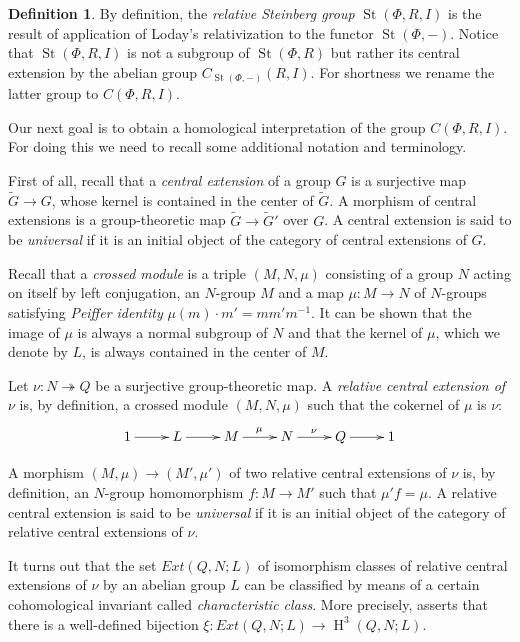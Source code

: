 \documentclass[oneside, 8pt]{amsart}
\theoremstyle{remark}
\theoremstyle{definition}
\numberwithin{lemma}{section}
\numberwithin{prop}{section}
\numberwithin{corollary}{section}
\newtheorem{df}[lemma]{Definition} \Crefname{df}{Definition}{Definitions}
\DeclareMathOperator{\St}{St}
\DeclareMathOperator{\HH}{H}
\numberwithin{equation}{section}
\begin{document}
\begin{df} By definition, the {\it relative Steinberg group} $\St(\Phi, R, I)$ is the result of application of Loday's relativization to the functor $\St(\Phi, -)$. Notice that $\St(\Phi, R, I)$ is not a subgroup of $\St(\Phi, R)$ but rather its central extension by the abelian group $C_{\St(\Phi, -)}(R, I)$. For shortness we rename the latter group to $C(\Phi, R, I)$. \end{df}

Our next goal is to obtain a homological interpretation of the group $C(\Phi, R, I)$.
For doing this we need to recall some additional notation and terminology.

First of all, recall that a {\it central extension} of a group $G$ is a surjective map $\widetilde{G} \to G$, whose kernel is contained in the center of $\widetilde{G}$. 
A morphism of central extensions is a group-theoretic map $\widetilde{G} \to \widetilde{G}'$ over $G$.
A central extension is said to be {\it universal} if it is an initial object of the category of central extensions of $G$.

Recall that a {\it crossed module} is a triple $(M, N, \mu)$ consisting of a group $N$ acting on itself by left conjugation, an $N$-group $M$ and a map
 $\mu \colon M\to N$ of $N$-groups satisfying {\it Peiffer identity} $\mu(m) \cdot m' = m m' m^{-1}$. It can be shown that the image of $\mu$ is always
  a normal subgroup of $N$ and that the kernel of $\mu$, which we denote by $L$, is always contained in the center of $M$. %
 
Let $\nu \colon N \twoheadrightarrow Q$ be a surjective group-theoretic map.
A {\it relative central extension of $\nu$} is, by definition,
a crossed module $(M, N, \mu)$ such that the cokernel of $\mu$ is $\nu$:
\begin{equation} \label{RelativeCentralExtension}
 \xymatrix{ 1 \ar[r] & L \ar[r] & M \ar^{\mu}[r] & N \ar^{\nu}[r] & Q \ar[r] & 1} \end{equation}

A morphism $(M, \mu) \to (M', \mu')$ of two relative central extensions of $\nu$ is, by definition, an $N$-group homomorphism $f\colon M \to M'$ such that $\mu' f = \mu$. 
A relative central extension is said to be {\it universal} if it is an initial object of the category of relative central extensions of $\nu$. 

It turns out that the set  $Ext(Q, N; L)$  of isomorphism classes of relative central extensions of $\nu$ by an abelian group $L$ can be classified by means of a certain cohomological invariant called {\it characteristic class}. More precisely, \cite[Th{\'e}or{\`e}me~1]{Lo78} asserts that there is a well-defined bijection $\xi \colon Ext(Q, N; L) \to \HH^3(Q, N; L)$.
 
\end{document}
